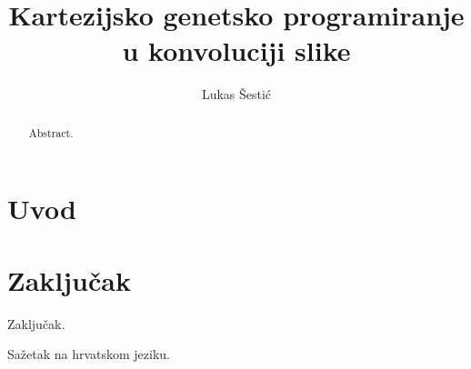 \documentclass[times, utf8, diplomski]{fer}
\begin{document}
\title{Kartezijsko genetsko programiranje u konvoluciji slike}
\author{Lukas Šestić}

\maketitle

\izvornik

\zahvala{}

\tableofcontents

\chapter{Uvod}


\chapter{Zaključak}
Zaključak.




\begin{sazetak}
Sažetak na hrvatskom jeziku.

\end{sazetak}

\begin{abstract}
Abstract.

\end{abstract}
\end{document}
